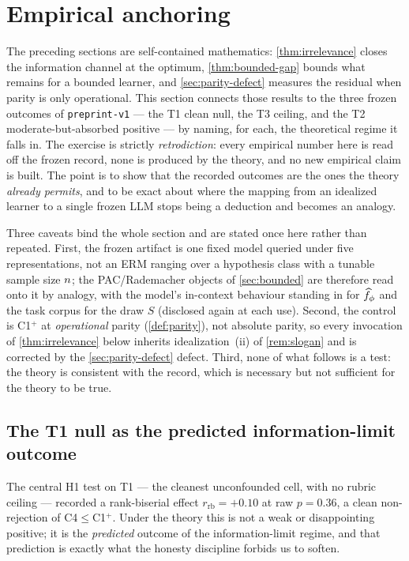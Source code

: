 \section{Empirical anchoring}
\label{sec:anchoring}

The preceding sections are self-contained mathematics: \cref{thm:irrelevance}
closes the information channel at the optimum, \cref{thm:bounded-gap} bounds
what remains for a bounded learner, and \cref{sec:parity-defect} measures the
residual when parity is only operational. This section connects those results
to the three frozen outcomes of \texttt{preprint-v1} --- the T1 clean null, the
T3 ceiling, and the T2 moderate-but-absorbed positive --- by naming, for each,
the theoretical regime it falls in. The exercise is strictly
\emph{retrodiction}: every empirical number here is read off the frozen record,
none is produced by the theory, and no new empirical claim is built. The point
is to show that the recorded outcomes are the ones the theory
\emph{already permits}, and to be exact about where the mapping from an
idealized learner to a single frozen LLM stops being a deduction and becomes an
analogy.

Three caveats bind the whole section and are stated once here rather than
repeated. First, the frozen artifact is one fixed model queried under five
representations, not an ERM ranging over a hypothesis class with a tunable
sample size $n$; the PAC/Rademacher objects of \cref{sec:bounded} are
therefore read onto it by analogy, with the model's in-context behaviour
standing in for $\widehat f_{\phi}$ and the task corpus for the draw $S$
(disclosed again at each use). Second, the control is C1${}^{+}$ at
\emph{operational} parity (\cref{def:parity}), not absolute parity, so every
invocation of \cref{thm:irrelevance} below inherits idealization~(ii) of
\cref{rem:slogan} and is corrected by the \cref{sec:parity-defect} defect.
Third, none of what follows is a test: the theory is consistent with the record,
which is necessary but not sufficient for the theory to be true.

\subsection{The T1 null as the predicted information-limit outcome}
\label{subsec:anchor-t1}

The central H1 test on T1 --- the cleanest unconfounded cell, with no rubric
ceiling --- recorded a rank-biserial effect $r_{\mathrm{rb}}=+0.10$ at raw
$p=0.36$, a clean non-rejection of C4${}\le{}$C1${}^{+}$. Under the theory this
is not a weak or disappointing positive; it is the \emph{predicted}
outcome of the information-limit regime, and that prediction is exactly what
the honesty discipline forbids us to soften.

